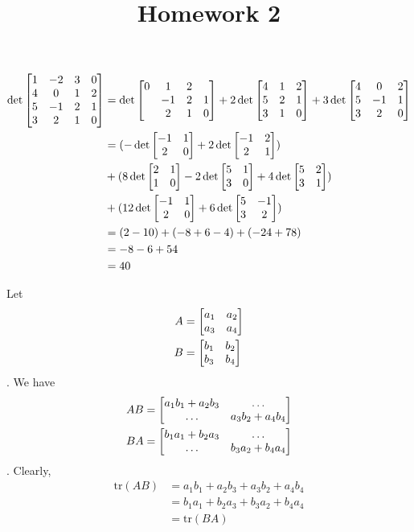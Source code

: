 \documentclass{homework}
\title{Homework 2}
\begin{document}
\maketitle

\begin{problem}{1}
\begin{align*}
\det\begin{bmatrix}1&-2&3&0\\4&0&1&2\\5&-1&2&1\\3&2&1&0\end{bmatrix}
&= \det\begin{bmatrix}0&1&2\\&-1&2&1\\&2&1&0\end{bmatrix} +
  2\det\begin{bmatrix}4&1&2\\5&2&1\\3&1&0\end{bmatrix} +
  3\det\begin{bmatrix}4&0&2\\5&-1&1\\3&2&0\end{bmatrix} \\
&= (-\det\begin{bmatrix}-1&1\\2&0\end{bmatrix} + 2\det\begin{bmatrix}-1&2\\2&1\end{bmatrix}) \\
&+ (8\det\begin{bmatrix}2&1\\1&0\end{bmatrix} - 2\det\begin{bmatrix}5&1\\3&0\end{bmatrix} + 4\det\begin{bmatrix}5&2\\3&1\end{bmatrix}) \\
&+ (12\det\begin{bmatrix}-1&1\\2&0\end{bmatrix} + 6\det\begin{bmatrix}5&-1\\3&2\end{bmatrix}) \\
&= (2-10)+(-8+6-4)+(-24+78) \\
&= -8-6+54 \\
&= 40
\end{align*}
\end{problem}

\begin{problem}{2}
Let
\begin{align*}
A &= \begin{bmatrix}a_1&a_2\\a_3&a_4\end{bmatrix} \\
B &= \begin{bmatrix}b_1&b_2\\b_3&b_4\end{bmatrix}
\end{align*}
. We have
\begin{align*}
AB &= \begin{bmatrix}a_1b_1 + a_2b_3 & \hdots \\ \hdots & a_3b_2 + a_4b_4\end{bmatrix} \\
BA &= \begin{bmatrix}b_1a_1 + b_2a_3 & \hdots \\ \hdots & b_3a_2 + b_4a_4\end{bmatrix}
\end{align*}
. Clearly,
\begin{align*}
\mathrm{tr}(AB) &=
a_1b_1 + a_2b_3 + a_3b_2 + a_4b_4 \\
&=
b_1a_1 + b_2a_3 + b_3a_2 + b_4a_4 \\
&=
\mathrm{tr}(BA)
\end{align*}
\end{problem}
\end{document}
